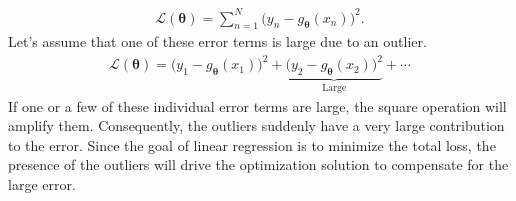\begin{align*}
	\mathcal{L}(\boldsymbol{\theta}) = \sum_{n=1}^N\bigg(y_n-g_{\boldsymbol{\theta}}(x_n)\bigg)^2.
\end{align*}
Let's assume that one of these error terms is large due to an outlier. 
\begin{align*}
	\mathcal{L}(\boldsymbol{\theta}) = \bigg(y_1-g_{\boldsymbol{\theta}}(x_1)\bigg)^2+\underbrace{\bigg(y_2-g_{\boldsymbol{\theta}}(x_2)\bigg)^2}_{\textrm{Large}}+\cdots
\end{align*}
If one or a few of these individual error terms are large, the square operation will amplify them.  Consequently, the outliers suddenly have a very large contribution to the error. Since the goal of linear regression is to minimize the total loss, the presence of the outliers will drive the optimization solution to compensate for the large error.



